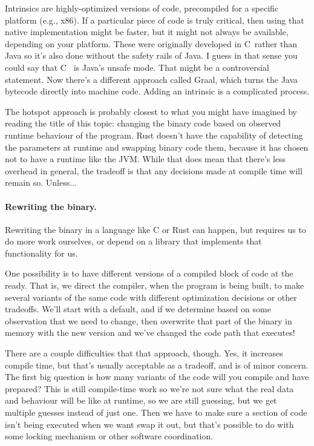 \documentclass[a4paper]{report}
\newcommand{\CPP}{C\nolinebreak\hspace{-.05em}\raisebox{.4ex}{\tiny\bf +}\nolinebreak\hspace{-.10em}\raisebox{.4ex}{\tiny\bf +}}
\def\CPP{{C\nolinebreak[4]\hspace{-.05em}\raisebox{.4ex}{\tiny\bf ++}}}
\begin{document}
Intrinsics are highly-optimized versions of code, precompiled for a specific platform (e.g., x86). If a particular piece of code is truly critical, then using that native implementation might be faster, but it might not always be available, depending on your platform. These were originally developed in \CPP~rather than Java so it's also done without the safety rails of Java. I guess in that sense you could say that \CPP~ is Java's unsafe mode. That might be a controversial statement. Now there's a different approach called Graal, which turns the Java bytecode directly into machine code. Adding an intrinsic is a complicated process.

The hotspot approach is probably closest to what you might have imagined by reading the title of this topic: changing the binary code based on observed runtime behaviour of the program. Rust doesn't have the capability of detecting the parameters at runtime and swapping binary code them, because it has chosen not to have a runtime like the JVM. While that does mean that there's less overhead in general, the tradeoff is that any decisions made at compile time will remain so. Unless...

\paragraph{Rewriting the binary.}
Rewriting the binary in a language like C or Rust can happen, but requires us to do more work ourselves, or depend on a library that implements that functionality for us.

One possibility is to have different versions of a compiled block of code at the ready. That is, we direct the compiler, when the program is being built, to make several variants of the same code with different optimization decisions or other tradeoffs. We'll start with a default, and if we determine based on some observation that we need to change, then overwrite that part of the binary in memory with the new version and we've changed the code path that executes!

There are a couple difficulties that that approach, though. Yes, it increases compile time, but that's usually acceptable as a tradeoff, and is of minor concern. The first big question is how many variants of the code will you compile and have prepared? This is still compile-time work so we're not sure what the real data and behaviour will be like at runtime, so we are still guessing, but we get multiple guesses instead of just one. Then we have to make sure a section of code isn't being executed when we want swap it out, but that's possible to do with some locking mechanism or other software coordination.
\end{document}
